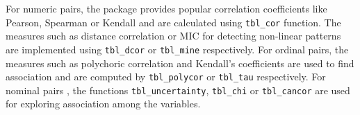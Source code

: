 \begin{Schunk}
\begin{table}

\caption{\label{tab:association-measures}List of the functions available in the package for calculating different association measures along with the packages used for calculation.}
\centering
{}
\end{table}

\end{Schunk}

For numeric pairs, the package provides popular correlation coefficients
like Pearson, Spearman or Kendall and are calculated using
\texttt{tbl\_cor} function. The measures such as distance correlation or
MIC for detecting non-linear patterns are implemented using
\texttt{tbl\_dcor} or \texttt{tbl\_mine} respectively. For ordinal
pairs, the measures such as polychoric correlation and Kendall's
coefficients are used to find association and are computed by
\texttt{tbl\_polycor} or \texttt{tbl\_tau} respectively. For nominal
pairs , the functions \texttt{tbl\_uncertainty}, \texttt{tbl\_chi} or
\texttt{tbl\_cancor} are used for exploring association among the
variables.

